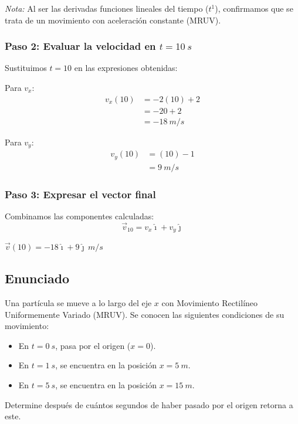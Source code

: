 \documentclass[12pt, a4paper]{article}
\begin{document}
\textit{Nota:} Al ser las derivadas funciones lineales del tiempo ($t^1$), confirmamos que se trata de un movimiento con aceleración constante (MRUV).

\subsubsection*{Paso 2: Evaluar la velocidad en $t = \SI{10}{s}$}
Sustituimos $t = 10$ en las expresiones obtenidas:

Para $v_x$:
\begin{align*}
    v_x(10) &= -2(10) + 2 \\
    &= -20 + 2 \\
    &= \SI{-18}{m/s}
\end{align*}

Para $v_y$:
\begin{align*}
    v_y(10) &= (10) - 1 \\
    &= \SI{9}{m/s}
\end{align*}

\subsubsection*{Paso 3: Expresar el vector final}
Combinamos las componentes calculadas:
\begin{equation*}
    \vec{v}_{10} = v_x\hat{\imath} + v_y\hat{\jmath}
\end{equation*}

\begin{tcolorbox}[colback=blue!5!white, colframe=blue!75!black, title=Respuesta Final]
    \centering
    \Large $\vec{v}(10) = -18\hat{\imath} + 9\hat{\jmath} \, \si{m/s}$
\end{tcolorbox}

\newpage
\subsection*{Enunciado}
Una partícula se mueve a lo largo del eje $x$ con Movimiento Rectilíneo Uniformemente Variado (MRUV). Se conocen las siguientes condiciones de su movimiento:
\begin{itemize}
    \item En $t = \SI{0}{s}$, pasa por el origen ($x=0$).
    \item En $t = \SI{1}{s}$, se encuentra en la posición $x = \SI{5}{m}$.
    \item En $t = \SI{5}{s}$, se encuentra en la posición $x = \SI{15}{m}$.
\end{itemize}
Determine después de cuántos segundos de haber pasado por el origen retorna a este.
\end{document}
